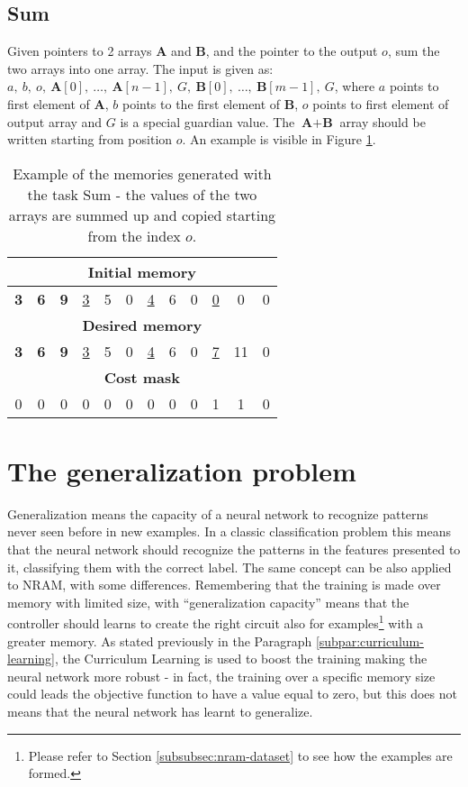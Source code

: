 \subsection{Sum}
Given pointers to 2 arrays \textbf{A} and \textbf{B}, and the pointer to the output $o$, sum the two arrays into one array. The input is given as: $a,\ b,\ o,\ \textbf{A}[0],\ \dots,\ \textbf{A}[n-1],\ G,\ \textbf{B}[0],\ \dots,\ \textbf{B}[m-1],\ G$, where $a$ points to first element of \textbf{A}, $b$ points to the first element of \textbf{B}, $o$ points to first element of output array and $G$ is a special guardian value. The $\textbf{A}+\textbf{B}$ array should be written starting from position $o$. An example is visible in Figure \ref{fig:sum-example}.
\begin{table}[h!]
	\centering
	\begin{tabular}{|c|c|c|c|c|c|c|c|c|c|c|c|}
		\hline
		\multicolumn{12}{|c|}{\textbf{Initial memory}} \\ \hline
		\textbf{3} & \textbf{6} & \textbf{9} & \underline{3} & 5 & 0 & \underline{4} & 6 & 0 & \underline{0} & 0 & 0 \\ \hline\hline\hline
		\multicolumn{12}{|c|}{\textbf{Desired memory}} \\ \hline
		\textbf{3} & \textbf{6} & \textbf{9} & \underline{3} & 5 & 0 & \underline{4} & 6 & 0 & \underline{7} & 11 & 0 \\ \hline\hline\hline
		\multicolumn{12}{|c|}{\textbf{Cost mask}} \\ \hline
		0 & 0 & 0 & 0 & 0 & 0 & 0 & 0 & 0 & 1 & 1 & 0 \\ \hline
	\end{tabular}
	\caption{Example of the memories generated with the task Sum - the values of the two arrays are summed up and copied starting from the index $o$.}
	\label{fig:sum-example}
\end{table}
\FloatBarrier

\section{The generalization problem}
Generalization means the capacity of a neural network to recognize patterns never seen before in new examples. In a classic classification problem this means that the neural network should recognize the patterns in the features presented to it, classifying them with the correct label. The same concept can be also applied to NRAM, with some differences. Remembering that the training is made over memory with limited size, with ``generalization capacity'' means that the controller should learns to create the right circuit also for examples\footnote{Please refer to Section \ref{subsubsec:nram-dataset} to see how the examples are formed.} with a greater memory. As stated previously in the Paragraph \ref{subpar:curriculum-learning}, the Curriculum Learning is used to boost the training making the neural network more robust - in fact, the training over a specific memory size could leads the objective function to have a value equal to zero, but this does not means that the neural network has learnt to generalize.

